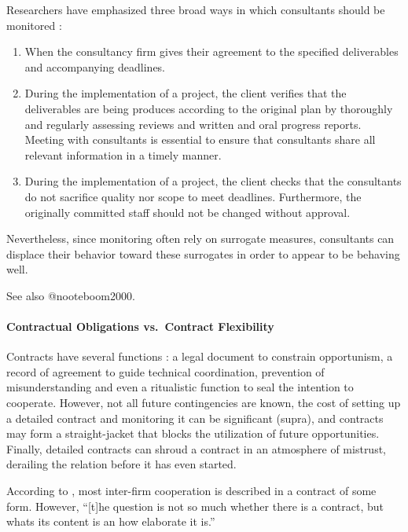 \documentclass[12pt]{article}
\providecommand{\tightlist}{%
  \setlength{\itemsep}{0pt}\setlength{\parskip}{0pt}}
\begin{document}
Researchers have emphasized three broad ways in which consultants should
be monitored \citep[ 15]{basu2011}:

\begin{enumerate}
\def\labelenumi{\arabic{enumi}.}
\tightlist
\item
  When the consultancy firm gives their agreement to the specified
  deliverables and accompanying deadlines.
\item
  During the implementation of a project, the client verifies that the
  deliverables are being produces according to the original plan by
  thoroughly and regularly assessing reviews and written and oral
  progress reports. Meeting with consultants is essential to ensure that
  consultants share all relevant information in a timely manner.
\item
  During the implementation of a project, the client checks that the
  consultants do not sacrifice quality nor scope to meet deadlines.
  Furthermore, the originally committed staff should not be changed
  without approval.
\end{enumerate}

Nevertheless, since monitoring often rely on surrogate measures,
consultants can displace their behavior toward these surrogates in order
to appear to be behaving well. \citep[ 281]{shapiro2005}

See also @nooteboom2000.

\hypertarget{contractual-obligations-vs.-contract-flexibility}{%
\paragraph{Contractual Obligations vs.~Contract
Flexibility}\label{contractual-obligations-vs.-contract-flexibility}}

Contracts have several functions \citep[ 924]{noteboom1996}: a legal
document to constrain opportunism, a record of agreement to guide
technical coordination, prevention of misunderstanding and even a
ritualistic function to seal the intention to cooperate. However, not
all future contingencies are known, the cost of setting up a detailed
contract and monitoring it can be significant (supra), and contracts may
form a straight-jacket that blocks the utilization of future
opportunities. Finally, detailed contracts can shroud a contract in an
atmosphere of mistrust, derailing the relation before it has even
started.

According to \citet[924]{nooteboom1996}, most inter-firm cooperation is
described in a contract of some form. However, ``{[}t{]}he question is
not so much whether there is a contract, but whats its content is an how
elaborate it is.''
\end{document}
